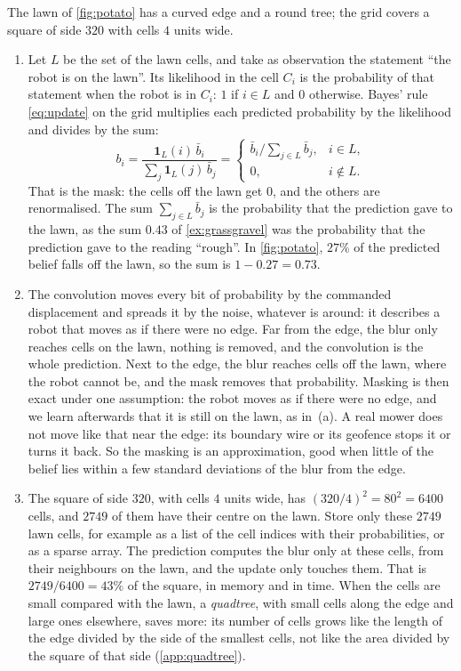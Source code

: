  The lawn of \cref{fig:potato} has a curved edge and a
round tree; the grid covers a square of side $320$ with cells $4$ units
wide.
\begin{enumerate}[nosep]
  \item Let $L$ be the set of the lawn cells, and take as observation
        the statement ``the robot is on the lawn''. Its likelihood in the
        cell $C_i$ is the probability of that statement when the robot
        is in $C_i$: $1$ if $i\in L$ and $0$ otherwise. Bayes' rule
        \eqref{eq:update} on the grid multiplies each predicted
        probability by the likelihood and divides by the sum:
        \[
          b_i=\frac{\mathbf 1_L(i)\,\bar b_i}{\sum_j\mathbf 1_L(j)\,\bar b_j}
          =\begin{cases}\bar b_i/\sum_{j\in L}\bar b_j,&i\in L,\\
          0,&i\notin L.\end{cases}
        \]
        That is the mask: the cells off the lawn get $0$, and the others
        are renormalised. The sum $\sum_{j\in L}\bar b_j$ is the
        probability that the prediction gave to the lawn, as the sum
        $0.43$ of \cref{ex:grassgravel} was the probability that the
        prediction gave to the reading ``rough''. In \cref{fig:potato},
        $27\%$ of the predicted belief falls off the lawn, so the sum is
        $1-0.27=0.73$.
  \item The convolution moves every bit of probability by the commanded
        displacement and spreads it by the noise, whatever is around: it
        describes a robot that moves as if there were no edge. Far from
        the edge, the blur only reaches cells on the lawn, nothing is
        removed, and the convolution is the whole prediction. Next to the
        edge, the blur reaches cells off the lawn, where the robot cannot
        be, and the mask removes that probability. Masking is then exact
        under one assumption: the robot moves as if there were no edge,
        and we learn afterwards that it is still on the lawn, as in~(a).
        A real mower does not move like that near the edge: its boundary
        wire or its geofence stops it or turns it back. So the masking is
        an approximation, good when little of the belief lies within a
        few standard deviations of the blur from the edge.
  \item The square of side $320$, with cells $4$ units wide, has
        $(320/4)^2=80^2=6400$ cells, and $2749$ of them have their
        centre on the lawn. Store only these $2749$ lawn cells, for example as a list of the
        cell indices with their probabilities, or as a sparse array. The
        prediction computes the blur only at these cells, from their
        neighbours on the lawn, and the update only touches them. That is
        $2749/6400=43\%$ of the square, in memory and in time. When the
        cells are small compared with the lawn, a \emph{quadtree}, with
        small cells along the edge and large ones elsewhere, saves more:
        its number of cells grows like the length of the edge divided by
        the side of the smallest cells, not like the area divided by the
        square of that side (\cref{app:quadtree}).
\end{enumerate}
